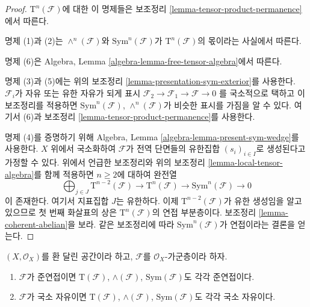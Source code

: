 \begin{proof}
$\text{T}^n(\mathcal{F})$에 대한 이 명제들은 보조정리
\ref{lemma-tensor-product-permanence}에서 따른다.

\medskip\noindent
명제 (1)과 (2)는 $\wedge^n(\mathcal{F})$와
$\text{Sym}^n(\mathcal{F})$가 $\text{T}^n(\mathcal{F})$의 몫이라는
사실에서 따른다.

\medskip\noindent
명제 (6)은 Algebra, Lemma \ref{algebra-lemma-free-tensor-algebra}에서 따른다.

\medskip\noindent
명제 (3)과 (5)에는 위의 보조정리
\ref{lemma-presentation-sym-exterior}를 사용한다. $\mathcal{F}_i$가
자유 또는 유한 자유가 되게 표시
$\mathcal{F}_2 \to \mathcal{F}_1 \to \mathcal{F} \to 0$
를 국소적으로 택하고 이 보조정리를 적용하면
$\text{Sym}^n(\mathcal{F})$, $\wedge^n(\mathcal{F})$가 비슷한 표시를
가짐을 알 수 있다. 여기서 (6)과 보조정리
\ref{lemma-tensor-product-permanence}를 사용한다.

\medskip\noindent
명제 (4)를 증명하기 위해 Algebra, Lemma
\ref{algebra-lemma-present-sym-wedge}를 사용한다. $X$ 위에서 국소화하여
$\mathcal{F}$가 전역 단면들의 유한집합 $(s_i)_{i \in I}$로 생성된다고
가정할 수 있다. 위에서 언급한 보조정리와 위의 보조정리
\ref{lemma-local-tensor-algebra}를 함께 적용하면 $n \geq 2$에 대하여 완전열
$$
\bigoplus\nolimits_{j \in J}
\text{T}^{n - 2}(\mathcal{F})
\to
\text{T}^n(\mathcal{F})
\to
\text{Sym}^n(\mathcal{F})
\to
0
$$
이 존재한다. 여기서 지표집합 $J$는 유한하다. 이제
$\text{T}^{n - 2}(\mathcal{F})$가 유한 생성임을 알고 있으므로 첫 번째
화살표의 상은 $\text{T}^n(\mathcal{F})$의 연접 부분층이다. 보조정리
\ref{lemma-coherent-abelian}을 보라. 같은 보조정리에 따라
$\text{Sym}^n(\mathcal{F})$가 연접이라는 결론을 얻는다.
\end{proof}

\begin{lemma}
\label{lemma-whole-tensor-algebra-permanence}
$(X, \mathcal{O}_X)$를 환 달린 공간이라 하고,
$\mathcal{F}$를 $\mathcal{O}_X$-가군층이라 하자.
\begin{enumerate}
\item $\mathcal{F}$가 준연접이면 $\text{T}(\mathcal{F})$,
$\wedge(\mathcal{F})$, $\text{Sym}(\mathcal{F})$도 각각 준연접이다.
\item $\mathcal{F}$가 국소 자유이면 $\text{T}(\mathcal{F})$,
$\wedge(\mathcal{F})$, $\text{Sym}(\mathcal{F})$도 각각 국소 자유이다.
\end{enumerate}
\end{lemma}

